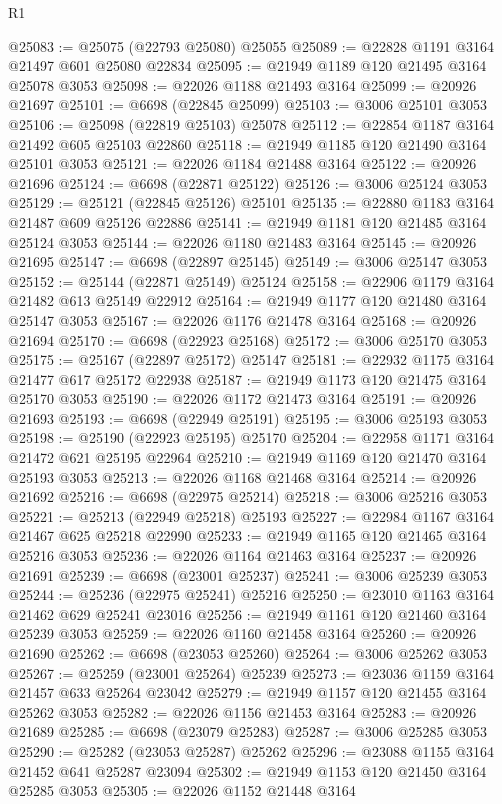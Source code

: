 \begin{lexlean}{R1}
\begin{coremodule}
@25083 := @25075 (@22793 @25080) @25055
@25089 := @22828 @1191 @3164 @21497 @601 @25080 @22834
@25095 := @21949 @1189 @120 @21495 @3164 @25078 @3053
@25098 := @22026 @1188 @21493 @3164
@25099 := @20926 @21697
@25101 := @6698 (@22845 @25099)
@25103 := @3006 @25101 @3053
@25106 := @25098 (@22819 @25103) @25078
@25112 := @22854 @1187 @3164 @21492 @605 @25103 @22860
@25118 := @21949 @1185 @120 @21490 @3164 @25101 @3053
@25121 := @22026 @1184 @21488 @3164
@25122 := @20926 @21696
@25124 := @6698 (@22871 @25122)
@25126 := @3006 @25124 @3053
@25129 := @25121 (@22845 @25126) @25101
@25135 := @22880 @1183 @3164 @21487 @609 @25126 @22886
@25141 := @21949 @1181 @120 @21485 @3164 @25124 @3053
@25144 := @22026 @1180 @21483 @3164
@25145 := @20926 @21695
@25147 := @6698 (@22897 @25145)
@25149 := @3006 @25147 @3053
@25152 := @25144 (@22871 @25149) @25124
@25158 := @22906 @1179 @3164 @21482 @613 @25149 @22912
@25164 := @21949 @1177 @120 @21480 @3164 @25147 @3053
@25167 := @22026 @1176 @21478 @3164
@25168 := @20926 @21694
@25170 := @6698 (@22923 @25168)
@25172 := @3006 @25170 @3053
@25175 := @25167 (@22897 @25172) @25147
@25181 := @22932 @1175 @3164 @21477 @617 @25172 @22938
@25187 := @21949 @1173 @120 @21475 @3164 @25170 @3053
@25190 := @22026 @1172 @21473 @3164
@25191 := @20926 @21693
@25193 := @6698 (@22949 @25191)
@25195 := @3006 @25193 @3053
@25198 := @25190 (@22923 @25195) @25170
@25204 := @22958 @1171 @3164 @21472 @621 @25195 @22964
@25210 := @21949 @1169 @120 @21470 @3164 @25193 @3053
@25213 := @22026 @1168 @21468 @3164
@25214 := @20926 @21692
@25216 := @6698 (@22975 @25214)
@25218 := @3006 @25216 @3053
@25221 := @25213 (@22949 @25218) @25193
@25227 := @22984 @1167 @3164 @21467 @625 @25218 @22990
@25233 := @21949 @1165 @120 @21465 @3164 @25216 @3053
@25236 := @22026 @1164 @21463 @3164
@25237 := @20926 @21691
@25239 := @6698 (@23001 @25237)
@25241 := @3006 @25239 @3053
@25244 := @25236 (@22975 @25241) @25216
@25250 := @23010 @1163 @3164 @21462 @629 @25241 @23016
@25256 := @21949 @1161 @120 @21460 @3164 @25239 @3053
@25259 := @22026 @1160 @21458 @3164
@25260 := @20926 @21690
@25262 := @6698 (@23053 @25260)
@25264 := @3006 @25262 @3053
@25267 := @25259 (@23001 @25264) @25239
@25273 := @23036 @1159 @3164 @21457 @633 @25264 @23042
@25279 := @21949 @1157 @120 @21455 @3164 @25262 @3053
@25282 := @22026 @1156 @21453 @3164
@25283 := @20926 @21689
@25285 := @6698 (@23079 @25283)
@25287 := @3006 @25285 @3053
@25290 := @25282 (@23053 @25287) @25262
@25296 := @23088 @1155 @3164 @21452 @641 @25287 @23094
@25302 := @21949 @1153 @120 @21450 @3164 @25285 @3053
@25305 := @22026 @1152 @21448 @3164

\end{coremodule}
\end{lexlean}
